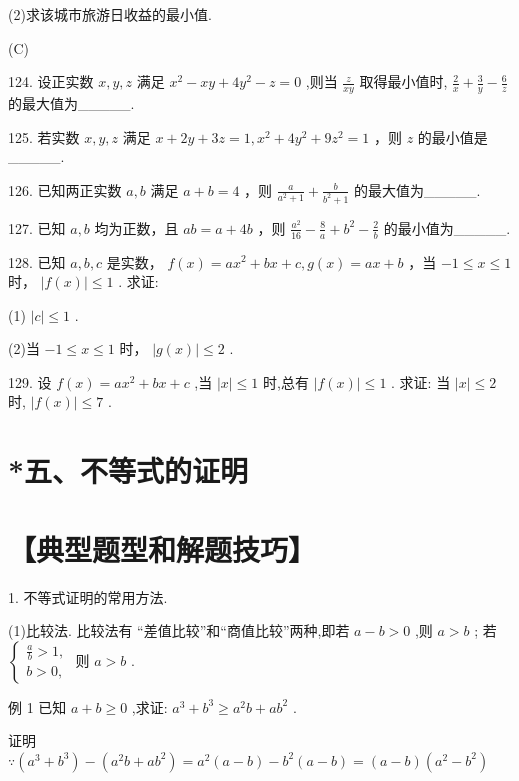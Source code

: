 \documentclass[10pt]{article}
\begin{document}
(2)求该城市旅游日收益的最小值.

(C)

124. 设正实数 \(x,y,z\) 满足 \({x}^{2} - {xy} + 4{y}^{2} - z = 0\) ,则当 \(\frac{z}{xy}\) 取得最小值时, \(\frac{2}{x} + \frac{3}{y} - \frac{6}{z}\) 的最大值为\_\_\_\_\_.

125. 若实数 \(x,y,z\) 满足 \(x + {2y} + {3z} = 1,{x}^{2} + 4{y}^{2} + 9{z}^{2} = 1\) ，则 \(z\) 的最小值是\_\_\_\_\_.

126. 已知两正实数 \(a,b\) 满足 \(a + b = 4\) ，则 \(\frac{a}{{a}^{2} + 1} + \frac{b}{{b}^{2} + 1}\) 的最大值为\_\_\_\_\_.

127. 已知 \(a,b\) 均为正数，且 \({ab} = a + {4b}\) ，则 \(\frac{{a}^{2}}{16} - \frac{8}{a} + {b}^{2} - \frac{2}{b}\) 的最小值为\_\_\_\_\_.

128. 已知 \(a,b,c\) 是实数， \(f\left( x\right)  = a{x}^{2} + {bx} + c,g\left( x\right)  = {ax} + b\) ，当 \(- 1 \leq  x \leq  1\) 时， \(\left| {f\left( x\right) }\right|  \leq  1\) . 求证:

(1) \(\left| c\right|  \leq  1\) .

(2)当 \(- 1 \leq  x \leq  1\) 时， \(\left| {g\left( x\right) }\right|  \leq  2\) .

129. 设 \(f\left( x\right)  = a{x}^{2} + {bx} + c\) ,当 \(\left| x\right|  \leq  1\) 时,总有 \(\left| {f\left( x\right) }\right|  \leq  1\) . 求证: 当 \(\left| x\right|  \leq  2\) 时, \(\left| {f\left( x\right) }\right|  \leq  7\) .

\section*{*五、不等式的证明}

\section*{【典型题型和解题技巧】}

1. 不等式证明的常用方法.

(1)比较法. 比较法有 “差值比较”和“商值比较”两种,即若 \(a - b > 0\) ,则 \(a > b\) ; 若 \(\left\{  \begin{array}{l} \frac{a}{b} > 1, \\  b > 0, \end{array}\right.\) 则 \(a > b\) .

例 1 已知 \(a + b \geq  0\) ,求证: \({a}^{3} + {b}^{3} \geq  {a}^{2}b + a{b}^{2}\) .

证明 \(\because \left( {{a}^{3} + {b}^{3}}\right)  - \left( {{a}^{2}b + a{b}^{2}}\right)  = {a}^{2}\left( {a - b}\right)  - {b}^{2}\left( {a - b}\right)  = \left( {a - b}\right) \left( {{a}^{2} - {b}^{2}}\right)\)
\end{document}
